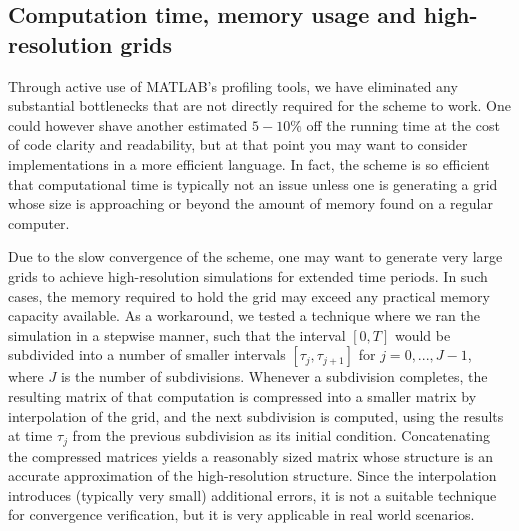 \subsection*{Computation time, memory usage and high-resolution grids}
Through active use of MATLAB's profiling tools, we have eliminated any substantial bottlenecks that are not directly required for the scheme to work. One could however shave another estimated $5-10\%$ off the running time at the cost of code clarity and readability, but at that point you may want to consider implementations in a more efficient language. In fact, the scheme is so efficient that computational time is typically not an issue unless one is generating a grid whose size is approaching or beyond the amount of memory found on a regular computer.

Due to the slow convergence of the scheme, one may want to generate very large grids to achieve high-resolution simulations for extended time periods. In such cases, the memory required to hold the grid may exceed any practical memory capacity available. As a workaround, we tested a technique where we ran the simulation in a stepwise manner, such that the interval $[0, T]$ would be subdivided into a number of smaller intervals $[\tau_j, \tau_{j+1}]$ for $j = 0, ..., J - 1$, where $J$ is the number of subdivisions. Whenever a subdivision completes, the resulting matrix of that computation is compressed into a smaller matrix by interpolation of the grid, and the next subdivision is computed, using the results at time $\tau_{j}$ from the previous subdivision as its initial condition. Concatenating the compressed matrices yields a reasonably sized matrix whose structure is an accurate approximation of the high-resolution structure. Since the interpolation introduces (typically very small) additional errors, it is not a suitable technique for convergence verification, but it is very applicable in real world scenarios.